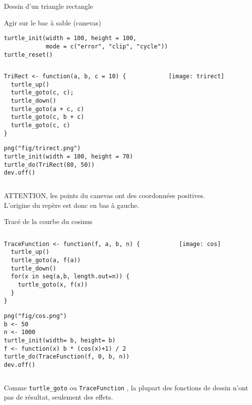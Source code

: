 \documentclass[10pt]{beamer}
\begin{document}
\begin{frame}[fragile]{Dessin d'un triangle rectangle}

  \begin{block}{Agir sur le bac à sable (canevas)}
    \begin{lstlisting}[style=edblock]
turtle_init(width = 100, height = 100,
            mode = c("error", "clip", "cycle"))
turtle_reset()
\end{lstlisting}


\begin{columns}[c]
\begin{column}{0.63\textwidth}
  \begin{lstlisting}[style=editor]
TriRect <- function(a, b, c = 10) {
  turtle_up()
  turtle_goto(c, c);
  turtle_down()
  turtle_goto(a + c, c)
  turtle_goto(c, b + c)
  turtle_goto(c, c)
}
\end{lstlisting}

\begin{lstlisting}[linerange=2-3]
png("fig/trirect.png")
turtle_init(width = 100, height = 70)
turtle_do(TriRect(80, 50))
dev.off()
\end{lstlisting}
\end{column}
\begin{column}{0.35\textwidth}
\texttt{[image: trirect]}
\end{column}
\end{columns}
  \end{block}

  \alert{ATTENTION}, les points du canevas ont des coordonnées positives. \\
  L'origine du repère est donc en bas à gauche.
\end{frame}


\begin{frame}[fragile]{Tracé de la courbe du cosinus}

\begin{columns}[c]
\begin{column}{0.63\textwidth}
\begin{lstlisting}[style=editor]
TraceFunction <- function(f, a, b, n) {
  turtle_up()
  turtle_goto(a, f(a))
  turtle_down()
  for(x in seq(a,b, length.out=n)) {
    turtle_goto(x, f(x))
  }
}
\end{lstlisting}

\begin{lstlisting}[linerange=2-6]
png("fig/cos.png")
b <- 50
n <- 1000
turtle_init(width= b, height= b)
f <- function(x) b * (cos(x)+1) / 2
turtle_do(TraceFunction(f, 0, b, n))
dev.off()
\end{lstlisting}
\end{column}
\begin{column}{0.35\textwidth}
 \texttt{[image: cos]}
\end{column}
\end{columns}

Comme \texttt{turtle\_goto} ou \texttt{TraceFunction} , la plupart des fonctions de dessin n'ont \alert{pas de résultat, seulement des effets}.
\end{frame}
\end{document}
